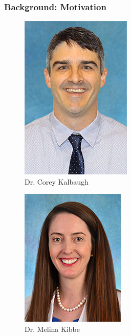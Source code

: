 \documentclass[xcolor=dvipsnames]{beamer}
\begin{document}
\begin{frame}
\frametitle{Background: Motivation}
\begin{minipage}[t]{.3\textwidth}
	\begin{figure}[h!]
		\centering
		\includegraphics[height = 0.65\textwidth]{Corey.jpg}
		\caption*{Dr. Corey Kalbaugh}	
	\end{figure}
\end{minipage}\hfill 
\begin{minipage}[t]{.3\textwidth}
	\begin{figure}[h!]
		\centering
		\includegraphics[height = 0.65\textwidth]{kibbe.jpg}
		\caption*{Dr. Melina Kibbe}
	\end{figure}

\end{minipage}
\end{frame}
\end{document}
